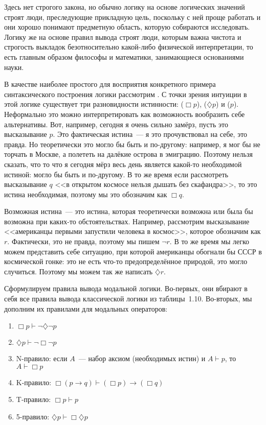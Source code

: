 Здесь нет строгого закона, но обычно логику на основе логических значений строят люди, преследующие прикладную цель, поскольку с ней проще работать и они хорошо понимают предметную область, которую собираются исследовать. Логику же на основе правил вывода строят люди, которым важна чистота и строгость выкладок безотносительно какой-либо физической интерпретации, то есть главным образом философы и математики, занимающиеся основаниями науки.

В качестве наиболее простого для восприятия конкретного примера синтаксического построения логики рассмотрим . С точки зрения интуиции в этой логике существует три разновидности истинности:  ($\Box p$),  ($\diamondsuit p$) и  ($p$). Неформально это можно интерпретировать как возможность вообразить себе альтернативы. Вот, например, сегодня я очень сильно замёрз, пусть это высказывание $p$. Это фактическая истина~--- я это прочувствовал на себе, это правда. Но теоретически это могло бы быть и по-другому: например, я мог бы не торчать в Москве, а полететь на далёкие острова в эмиграцию. Поэтому нельзя сказать, что то что я сегодня мёрз весь день является какой-то необходимой истиной: могло бы быть и по-другому. В то же время если рассмотреть высказывание $q$ <<в открытом космосе нельзя дышать без скафандра>>, то это истина необходимая, поэтому мы это обозначим как $\Box q$.

Возможная истина~--- это истина, которая теоретически возможна или была бы возможна при каких-то обстоятельствах. Например, рассмотрим высказывание <<американцы первыми запустили человека в космос>>, которое обозначим как $r$. Фактически, это не правда, поэтому мы пишем $\neg r$. В то же время мы легко можем представить себе ситуацию, при которой американцы обогнали бы СССР в космической гонке: это не есть что-то предопределённое природой, это могло случиться. Поэтому мы можем так же написать $\diamondsuit r$. 

Сформулируем правила вывода модальной логики. Во-первых, они вбирают в себя все правила вывода классической логики из таблицы~1.10. Во-вторых, мы дополним их правилами для модальных операторов:

\begin{enumerate}
\item $\Box p \vdash \neg \diamondsuit \neg p$
\item $\diamondsuit p \vdash \neg \Box \neg p$
\item N-правило: если $A$~--- набор аксиом (необходимых истин) и $A\vdash p$, то $A\vdash \Box p$
\item K-правило: $\Box (p\to q) \vdash (\Box p) \to (\Box q)$
\item T-правило: $\Box p \vdash p$
\item 5-правило: $\diamondsuit p \vdash \Box \diamondsuit p$
\end{enumerate}

